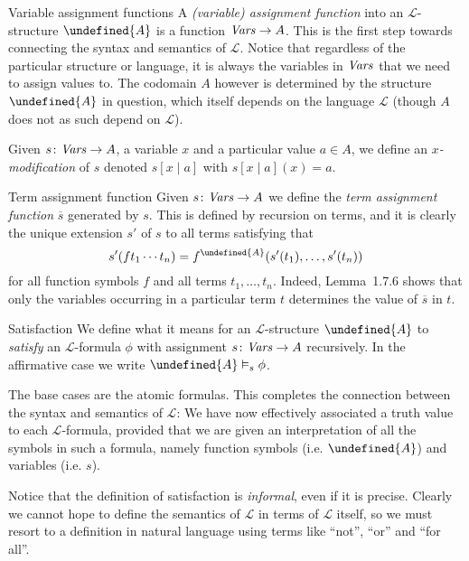 \documentclass[article, a4paper, 11pt, oneside]{memoir}
\let\mathfrak\undefined
\numberwithin{equation}{chapter}
\newcommand{\calL}{\mathcal{L}}
\newcommand{\frakA}{\mathfrak{A}}
\theoremstyle{nonumberplain}
\begin{document}
\begin{notelist}
    \item[Variable assignment functions]
    A \emph{(variable) assignment function} into an $\calL$-structure $\frakA$ is a function $\mathit{Vars} \to A$. This is the first step towards connecting the syntax and semantics of $\calL$. Notice that regardless of the particular structure or language, it is always the variables in $\mathit{Vars}$ that we need to assign values to. The codomain $A$ however is determined by the structure $\frakA$ in question, which itself depends on the language $\calL$ (though $A$ does not as such depend on $\calL$).

    Given $s \colon \mathit{Vars} \to A$, a variable $x$ and a particular value $a \in A$, we define an \emph{$x$-modification} of $s$ denoted $s[x \mid a]$ with $s[x \mid a](x) = a$.

    \item[Term assignment function]
    Given $s \colon \mathit{Vars} \to A$ we define the \emph{term assignment function} $\overline{s}$ generated by $s$. This is defined by recursion on terms, and it is clearly the unique extension $s'$ of $s$ to all terms satisfying that
    \begin{equation*}
        s'(f t_1 \cdots t_n)
            = f^\frakA (s'(t_1), \ldots, s'(t_n))
    \end{equation*}
    for all function symbols $f$ and all terms $t_1, \ldots, t_n$. Indeed, Lemma~1.7.6 shows that only the variables occurring in a particular term $t$ determines the value of $\overline{s}$ in $t$.

    \item[Satisfaction]
    We define what it means for an $\calL$-structure $\frakA$ to \emph{satisfy} an $\calL$-formula $\phi$ with assignment $s \colon \mathit{Vars} \to A$ recursively. In the affirmative case we write $\frakA \sats{s} \phi$.
    
    The base cases are the atomic formulas. This completes the connection between the syntax and semantics of $\calL$: We have now effectively associated a truth value to each $\calL$-formula, provided that we are given an interpretation of all the symbols in such a formula, namely function symbols (i.e. $\frakA$) and variables (i.e. $s$).

    Notice that the definition of satisfaction is \emph{informal}, even if it is precise. Clearly we cannot hope to define the semantics of $\calL$ in terms of $\calL$ itself, so we must resort to a definition in natural language using terms like \enquote{not}, \enquote{or} and \enquote{for all}.


\end{notelist}
\end{document}
